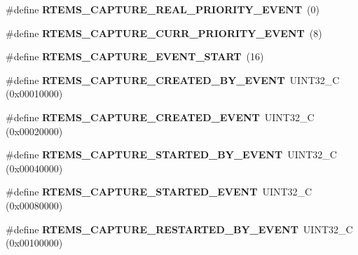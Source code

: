 \begin{DoxyCompactItemize}
\item 
\mbox{\label{group__libmisc__capture_ga7e0162bcf40ddb2aa35dfed1fd27dd67}} 
\#define {\bfseries R\+T\+E\+M\+S\+\_\+\+C\+A\+P\+T\+U\+R\+E\+\_\+\+R\+E\+A\+L\+\_\+\+P\+R\+I\+O\+R\+I\+T\+Y\+\_\+\+E\+V\+E\+NT}~(0)
\item 
\mbox{\label{group__libmisc__capture_gaf74f6ab2bb107e5368ff5de929ad2159}} 
\#define {\bfseries R\+T\+E\+M\+S\+\_\+\+C\+A\+P\+T\+U\+R\+E\+\_\+\+C\+U\+R\+R\+\_\+\+P\+R\+I\+O\+R\+I\+T\+Y\+\_\+\+E\+V\+E\+NT}~(8)
\item 
\mbox{\label{group__libmisc__capture_ga719d223c5d8ad5517a22f5c8676e563d}} 
\#define {\bfseries R\+T\+E\+M\+S\+\_\+\+C\+A\+P\+T\+U\+R\+E\+\_\+\+E\+V\+E\+N\+T\+\_\+\+S\+T\+A\+RT}~(16)
\item 
\mbox{\label{group__libmisc__capture_ga114d4b01090d7addef7d98f23f94e855}} 
\#define {\bfseries R\+T\+E\+M\+S\+\_\+\+C\+A\+P\+T\+U\+R\+E\+\_\+\+C\+R\+E\+A\+T\+E\+D\+\_\+\+B\+Y\+\_\+\+E\+V\+E\+NT}~U\+I\+N\+T32\+\_\+C (0x00010000)
\item 
\mbox{\label{group__libmisc__capture_gaf5a7848b106ee6a3e520283ede57f705}} 
\#define {\bfseries R\+T\+E\+M\+S\+\_\+\+C\+A\+P\+T\+U\+R\+E\+\_\+\+C\+R\+E\+A\+T\+E\+D\+\_\+\+E\+V\+E\+NT}~U\+I\+N\+T32\+\_\+C (0x00020000)
\item 
\mbox{\label{group__libmisc__capture_gaa406b1d3407f810e2e98a19b48534862}} 
\#define {\bfseries R\+T\+E\+M\+S\+\_\+\+C\+A\+P\+T\+U\+R\+E\+\_\+\+S\+T\+A\+R\+T\+E\+D\+\_\+\+B\+Y\+\_\+\+E\+V\+E\+NT}~U\+I\+N\+T32\+\_\+C (0x00040000)
\item 
\mbox{\label{group__libmisc__capture_ga9b3713a6fe95344153d59d965cbeae81}} 
\#define {\bfseries R\+T\+E\+M\+S\+\_\+\+C\+A\+P\+T\+U\+R\+E\+\_\+\+S\+T\+A\+R\+T\+E\+D\+\_\+\+E\+V\+E\+NT}~U\+I\+N\+T32\+\_\+C (0x00080000)
\item 
\mbox{\label{group__libmisc__capture_ga099b6fc22954322705c846f9affa6581}} 
\#define {\bfseries R\+T\+E\+M\+S\+\_\+\+C\+A\+P\+T\+U\+R\+E\+\_\+\+R\+E\+S\+T\+A\+R\+T\+E\+D\+\_\+\+B\+Y\+\_\+\+E\+V\+E\+NT}~U\+I\+N\+T32\+\_\+C (0x00100000)

\end{DoxyCompactItemize}

